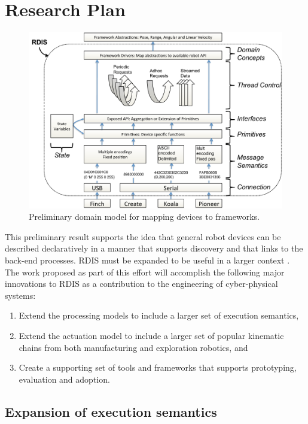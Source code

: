 
\section{Research Plan}
\label{sec:research-plan}

\begin{figure}[thpb]
      \centering
      \includegraphics[width=5in]{images/dm.pdf}
      \caption{Preliminary domain model for mapping devices to frameworks.}
      \label{dm}
\end{figure}

This preliminary result supports the idea that general robot devices can be described declaratively in a manner that supports discovery and that links to the back-end processes.  RDIS must be expanded to be useful in a larger context .  The work proposed as part of this effort will accomplish the following major innovations to RDIS as a contribution to the engineering of cyber-physical systems: 
\begin{enumerate}
\item Extend the processing models to include a larger set of execution semantics, 
\item Extend the actuation model to include a larger set of popular kinematic chains from both manufacturing and exploration robotics, and
\item Create a supporting set of tools and frameworks that supports prototyping, evaluation and adoption.   
\end{enumerate}

\subsection{Expansion of execution semantics}

